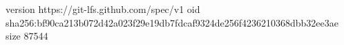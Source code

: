 version https://git-lfs.github.com/spec/v1
oid sha256:bf90ca213b072d42a023f29e19db7fdcaf9324de256f4236210368dbb32ee3ae
size 87544
